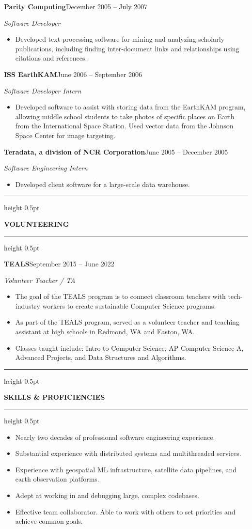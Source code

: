 \documentclass[10pt,letterpaper]{article}
\newcommand{\ressection}[1]{%
  \vspace{3pt}%
  {\color{rulecolor}\hrule height 0.5pt}%
  \vspace{3pt}%
  {\normalsize\bfseries\color{sectionblue}#1}%
  \vspace{3pt}%
  {\color{rulecolor}\hrule height 0.5pt}%
  \vspace{3pt}%
}
\newcommand{\jobheader}[2]{%
  \vspace{3pt}%
  \hspace{1em}\textbf{#1}\hfill#2%
  \vspace{1pt}%
}
\newcommand{\jobtitle}[1]{%
  \par\hspace{1em}\textit{#1}%
  \vspace{2pt}%
}
\begin{document}
\jobheader{Parity Computing}{December 2005 -- July 2007}
\jobtitle{Software Developer}

\begin{itemize}
  \item Developed text processing software for mining and analyzing scholarly publications, including finding inter-document links and relationships using citations and references.
\end{itemize}

\jobheader{ISS EarthKAM}{June 2006 -- September 2006}
\jobtitle{Software Developer Intern}

\begin{itemize}
  \item Developed software to assist with storing data from the EarthKAM program, allowing middle school students to take photos of specific places on Earth from the International Space Station. Used vector data from the Johnson Space Center for image targeting.
\end{itemize}

\jobheader{Teradata, a division of NCR Corporation}{June 2005 -- December 2005}
\jobtitle{Software Engineering Intern}

\begin{itemize}
  \item Developed client software for a large-scale data warehouse.
\end{itemize}

\ressection{VOLUNTEERING}

\jobheader{TEALS}{September 2015 -- June 2022}
\jobtitle{Volunteer Teacher / TA}

\begin{itemize}
  \item The goal of the TEALS program is to connect classroom teachers with tech-industry workers to create sustainable Computer Science programs.
  \item As part of the TEALS program, served as a volunteer teacher and teaching assistant at high schools in Redmond, WA and Easton, WA.
  \item Classes taught include: Intro to Computer Science, AP Computer Science A, Advanced Projects, and Data Structures and Algorithms.
\end{itemize}

\ressection{SKILLS \& PROFICIENCIES}

\begin{itemize}
  \item Nearly two decades of professional software engineering experience.
  \item Substantial experience with distributed systems and multithreaded services.
  \item Experience with geospatial ML infrastructure, satellite data pipelines, and earth observation platforms.
  \item Adept at working in and debugging large, complex codebases.
  \item Effective team collaborator. Able to work with others to set priorities and achieve common goals.
\end{itemize}
\end{document}
